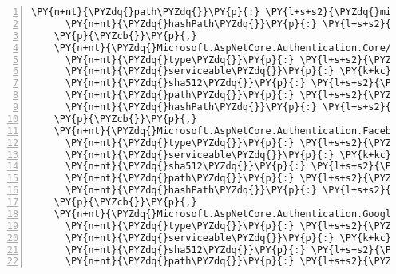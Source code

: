\begin{Verbatim}[commandchars=\\\{\},numbers=left,firstnumber=1,stepnumber=1,numberblanklines=0]
      \PY{n+nt}{\PYZdq{}path\PYZdq{}}\PY{p}{:} \PY{l+s+s2}{\PYZdq{}microsoft.aspnetcore.authentication.cookies/2.1.0\PYZhy{}rc1\PYZhy{}final\PYZdq{}}\PY{p}{,}
      \PY{n+nt}{\PYZdq{}hashPath\PYZdq{}}\PY{p}{:} \PY{l+s+s2}{\PYZdq{}microsoft.aspnetcore.authentication.cookies.2.1.0\PYZhy{}rc1\PYZhy{}final.nupkg.sha512\PYZdq{}}
    \PY{p}{\PYZcb{}}\PY{p}{,}
    \PY{n+nt}{\PYZdq{}Microsoft.AspNetCore.Authentication.Core/2.1.0\PYZhy{}rc1\PYZhy{}final\PYZdq{}}\PY{p}{:} \PY{p}{\PYZob{}}
      \PY{n+nt}{\PYZdq{}type\PYZdq{}}\PY{p}{:} \PY{l+s+s2}{\PYZdq{}package\PYZdq{}}\PY{p}{,}
      \PY{n+nt}{\PYZdq{}serviceable\PYZdq{}}\PY{p}{:} \PY{k+kc}{true}\PY{p}{,}
      \PY{n+nt}{\PYZdq{}sha512\PYZdq{}}\PY{p}{:} \PY{l+s+s2}{\PYZdq{}sha512\PYZhy{}8UO5qe2oPrdtAiinexjwHlbhk3METwjHRSt+aeUo+BnYKMw0Y4pmAfLYOe5O3Dk/kPf5jI/67Lmkcl4mskCvOQ==\PYZdq{}}\PY{p}{,}
      \PY{n+nt}{\PYZdq{}path\PYZdq{}}\PY{p}{:} \PY{l+s+s2}{\PYZdq{}microsoft.aspnetcore.authentication.core/2.1.0\PYZhy{}rc1\PYZhy{}final\PYZdq{}}\PY{p}{,}
      \PY{n+nt}{\PYZdq{}hashPath\PYZdq{}}\PY{p}{:} \PY{l+s+s2}{\PYZdq{}microsoft.aspnetcore.authentication.core.2.1.0\PYZhy{}rc1\PYZhy{}final.nupkg.sha512\PYZdq{}}
    \PY{p}{\PYZcb{}}\PY{p}{,}
    \PY{n+nt}{\PYZdq{}Microsoft.AspNetCore.Authentication.Facebook/2.1.0\PYZhy{}rc1\PYZhy{}final\PYZdq{}}\PY{p}{:} \PY{p}{\PYZob{}}
      \PY{n+nt}{\PYZdq{}type\PYZdq{}}\PY{p}{:} \PY{l+s+s2}{\PYZdq{}package\PYZdq{}}\PY{p}{,}
      \PY{n+nt}{\PYZdq{}serviceable\PYZdq{}}\PY{p}{:} \PY{k+kc}{true}\PY{p}{,}
      \PY{n+nt}{\PYZdq{}sha512\PYZdq{}}\PY{p}{:} \PY{l+s+s2}{\PYZdq{}sha512\PYZhy{}X74WS9eeZF5A+7l830U+LCxyAc03+ztD/KqTruB7qsut2zh4VDjHvYhORcCL93XWbofP/HiegwDiwsi/FE+Dxg==\PYZdq{}}\PY{p}{,}
      \PY{n+nt}{\PYZdq{}path\PYZdq{}}\PY{p}{:} \PY{l+s+s2}{\PYZdq{}microsoft.aspnetcore.authentication.facebook/2.1.0\PYZhy{}rc1\PYZhy{}final\PYZdq{}}\PY{p}{,}
      \PY{n+nt}{\PYZdq{}hashPath\PYZdq{}}\PY{p}{:} \PY{l+s+s2}{\PYZdq{}microsoft.aspnetcore.authentication.facebook.2.1.0\PYZhy{}rc1\PYZhy{}final.nupkg.sha512\PYZdq{}}
    \PY{p}{\PYZcb{}}\PY{p}{,}
    \PY{n+nt}{\PYZdq{}Microsoft.AspNetCore.Authentication.Google/2.1.0\PYZhy{}rc1\PYZhy{}final\PYZdq{}}\PY{p}{:} \PY{p}{\PYZob{}}
      \PY{n+nt}{\PYZdq{}type\PYZdq{}}\PY{p}{:} \PY{l+s+s2}{\PYZdq{}package\PYZdq{}}\PY{p}{,}
      \PY{n+nt}{\PYZdq{}serviceable\PYZdq{}}\PY{p}{:} \PY{k+kc}{true}\PY{p}{,}
      \PY{n+nt}{\PYZdq{}sha512\PYZdq{}}\PY{p}{:} \PY{l+s+s2}{\PYZdq{}sha512\PYZhy{}Y1mVRIG+5dJJrqLtqU1JT1a8enV/3+xhX1TZx3QHPhuK7atYtcMJkgZdAN3w09KAbcaGBKM0nAqmFc3kD3Mg9w==\PYZdq{}}\PY{p}{,}
      \PY{n+nt}{\PYZdq{}path\PYZdq{}}\PY{p}{:} \PY{l+s+s2}{\PYZdq{}microsoft.aspnetcore.authentication.google/2.1.0\PYZhy{}rc1\PYZhy{}final\PYZdq{}}\PY{p}{,}

\end{Verbatim}
